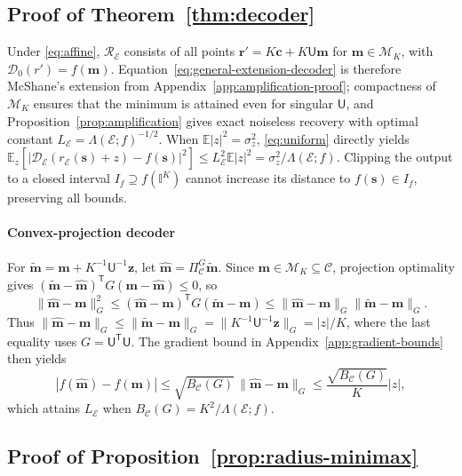 \documentclass[journal,12pt,onecolumn,draftclsnofoot]{IEEEtran}
\newcommand{\enc}{\mathscr{E}}\newcommand{\dec}{\mathscr{D}}\newcommand{\R}{\mathbb R}\newcommand{\C}{\mathbb C}
\newcommand{\T}{\mathsf T}\newcommand{\suc}{\succeq}
\begin{document}
\subsection{Proof of Theorem~\ref{thm:decoder}}\label{app:general-decoder-proof}



Under \eqref{eq:affine}, $\mathcal R_\enc$ consists of all points $\boldsymbol r'=K\boldsymbol c+K\mathsf U\boldsymbol m$ for $\boldsymbol m\in\mathcal M_K$, with $\dec_0(r')=f(\boldsymbol m)$. 
Equation~\eqref{eq:general-extension-decoder} is therefore McShane's extension from Appendix~\ref{app:amplification-proof}; compactness of $\mathcal M_K$ ensures that the minimum is attained even for singular $\mathsf U$, and Proposition~\ref{prop:amplification} gives exact noiseless recovery with optimal constant $L_\enc=\Lambda(\enc;f)^{-1/2}$. 
When $\mathbb E|z|^2=\sigma_z^2$, \eqref{eq:uniform} directly yields $\mathbb E_z[|\dec_\enc(r_\enc(\boldsymbol s)+z)-f(\boldsymbol s)|^2]\le L_\enc^2\mathbb E|z|^2=\sigma_z^2/\Lambda(\enc;f)$. 
Clipping the output to a closed interval $I_f\supseteq f(\mathbb I^K)$ cannot increase its distance to $f(\boldsymbol s)\in I_f$, preserving all bounds.

\paragraph{Convex-projection decoder}
For $\tilde{\boldsymbol m}=\boldsymbol m+K^{-1}\mathsf U^{-1}\boldsymbol z$, let $\hat{\boldsymbol m}=\Pi_{\mathcal C}^G\tilde{\boldsymbol m}$. 
Since $\boldsymbol m\in\mathcal M_K\subseteq\mathcal C$, projection optimality gives $(\tilde{\boldsymbol m}-\hat{\boldsymbol m})^\T G(\boldsymbol m-\hat{\boldsymbol m})\le0$, so
$$
\|\hat{\boldsymbol m}-\boldsymbol m\|_G^2
\le(\hat{\boldsymbol m}-\boldsymbol m)^\T G(\tilde{\boldsymbol m}-\boldsymbol m)
\le\|\hat{\boldsymbol m}-\boldsymbol m\|_G\|\tilde{\boldsymbol m}-\boldsymbol m\|_G.
$$
Thus $\|\hat{\boldsymbol m}-\boldsymbol m\|_G\le\|\tilde{\boldsymbol m}-\boldsymbol m\|_G=\|K^{-1}\mathsf U^{-1}\boldsymbol z\|_G=|z|/K$, where the last equality uses $G=\mathsf U^\T\mathsf U$. 
The gradient bound in Appendix~\ref{app:gradient-bounds} then yields
$$
|f(\hat{\boldsymbol m})-f(\boldsymbol m)|
\le\sqrt{B_{\mathcal C}(G)}\,\|\hat{\boldsymbol m}-\boldsymbol m\|_G
\le\frac{\sqrt{B_{\mathcal C}(G)}}K|z|,
$$
which attains $L_\enc$ when $B_{\mathcal C}(G)=K^2/\Lambda(\enc;f)$.


\subsection{Proof of Proposition~\ref{prop:radius-minimax}}\label{app:radius-minimax-proof}
\end{document}
